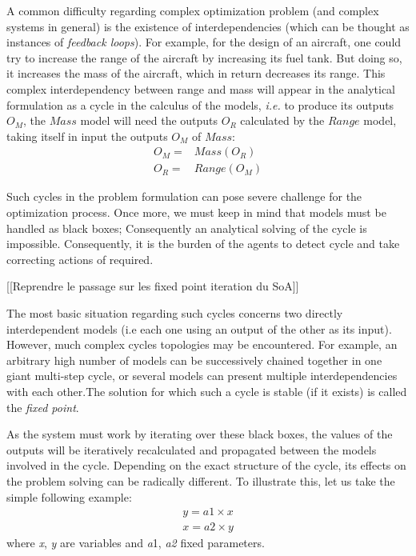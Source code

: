 A common difficulty regarding complex optimization problem (and complex systems in general) is the existence of interdependencies (which can be thought as instances of \emph{feedback loops}). For example, for the design of an aircraft, one could try to increase the range of the aircraft by increasing its fuel tank. But doing so, it increases the mass of the aircraft, which in return decreases its range. This complex interdependency between range and mass will appear in the analytical formulation as a cycle in the calculus of the models, \emph{i.e.} to produce its outputs $O_M$, the $Mass$ model will need the outputs $O_R$ calculated by the $Range$ model, taking itself in input the outputs $O_M$ of $Mass$:
\begin{align*}
O_M = &Mass(O_R)\\
O_R = &Range(O_M)
\end{align*}

Such cycles in the problem formulation can pose severe challenge for the optimization process. Once more, we must keep in mind that models must be handled as black boxes; Consequently an analytical solving of the cycle is impossible. Consequently, it is the burden of the agents to detect cycle and take correcting actions of required.

[[Reprendre le passage sur les fixed point iteration du SoA]]

The most basic situation regarding such cycles concerns two directly interdependent models (i.e each one using an output of the other as its input). However, much complex cycles topologies may be encountered. For example, an arbitrary high number of models can be successively chained together in one giant multi-step cycle, or several models can present multiple interdependencies with each other.The solution for which such a cycle is stable (if it exists) is called the \emph{fixed point}.

As the system must work by iterating over these black boxes, the values of the outputs will be iteratively recalculated and propagated between the models involved in the cycle. Depending on the exact structure of the cycle, its effects on the problem solving can be radically different. To illustrate this, let us take the simple following example:
\begin{gather*}
y = a1 \times x \\
x = a2 \times y
\end{gather*}
where \emph{x}, \emph{y} are variables and \emph{a}1, \emph{a2} fixed parameters.
 
